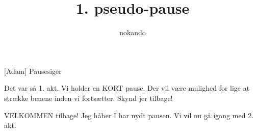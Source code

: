 \documentclass[a4paper]{article}
\title{1. pseudo-pause}
\author{nokando}
\begin{document}
\maketitle

\begin{roles}
[Adam] Pausesiger
\end{roles}

\begin{props}
\end{props}

\begin{sketch}


 Det var så 1. akt. Vi holder en KORT pause. Der vil være
mulighed for lige at strække benene inden vi fortsætter. Skynd jer tilbage!



 VELKOMMEN tilbage! Jeg håber I har nydt pausen. Vi vil nu gå
igang med 2. akt.


\end{sketch}
\end{document}

